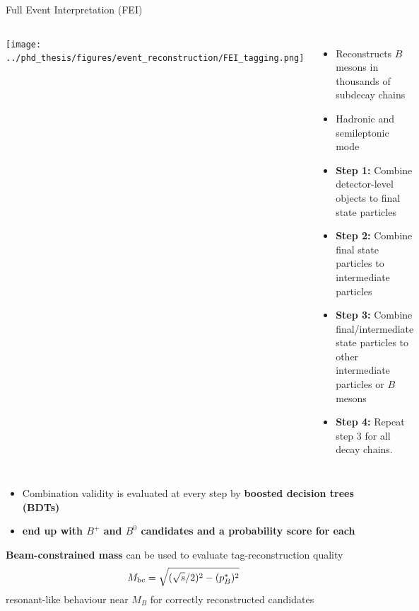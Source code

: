 \documentclass[xcolor=dvipsnames]{beamer}
\begin{document}
   \begin{frame}{Full Event Interpretation (FEI)}
      \scriptsize\centering
   \begin{columns}
         \texttt{[image: ../phd\_thesis/figures/event\_reconstruction/FEI\_tagging.png]}
         \begin{itemize}
            \item Reconstructs $B$ mesons in thousands of subdecay chains
            \item Hadronic and semileptonic mode
            \item \textbf{Step 1:} Combine detector-level objects to final state particles
            \item \textbf{Step 2:} Combine final state particles to intermediate particles
            \item \textbf{Step 3:} Combine final/intermediate state particles to other intermediate particles or $B$ mesons
            \item \textbf{Step 4:} Repeat step 3 for all decay chains.
         \end{itemize}
      
   \end{columns}
\begin{itemize}
   \item[\ra] Combination validity is evaluated at every step by \textbf{boosted decision trees (BDTs)}
   \item[\ra]\textbf{end up with $B^+$ and $B^0$ candidates and a probability score \feiProb for each}
\end{itemize}   

\vspace{10pt}

\textbf{Beam-constrained mass} can be used to evaluate tag-reconstruction quality
\vspace{-5pt}
\begin{equation*}
{\ensuremath{M_{\mathrm{bc}}}} = \sqrt{(\sqrt{s}/2)^2 - (p^*_B)^2}
\end{equation*}
\ra resonant-like behaviour near $M_B$ for correctly reconstructed candidates

\end{frame}
\end{document}
